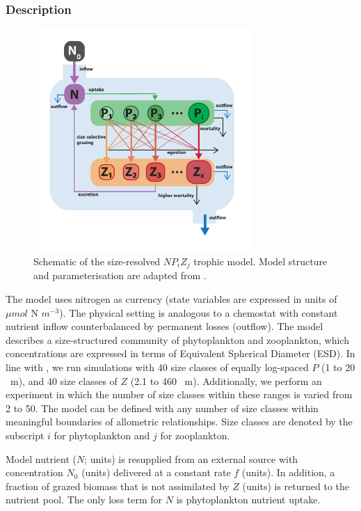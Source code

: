 \documentclass[journal abbreviation, manuscript]{copernicus}
\begin{document}
\subsubsection{Description}
\begin{figure}[t]
\includegraphics[width=8.3cm]{Figures/firstdraft_schematics/03_schematics_ASTroCAT.pdf}
\caption{Schematic of the size-resolved $NP_{i}Z_{j}$ trophic model. Model structure and parameterisation are adapted from \citet{Banas2011b}.}
\label{Figure:ModelSchematics_3}
\end{figure}

The model uses nitrogen as currency (state variables are expressed in units of $\mu mol$ N $m^{-3}$). The physical setting is analogous to a chemostat with constant nutrient inflow counterbalanced by permanent losses (outflow). The model describes a size-structured community of phytoplankton and zooplankton, which concentrations are expressed in terms of Equivalent Spherical Diameter (ESD). In line with \citet{Banas2011b}, we run simulations with 40 size classes of equally log-spaced $P$ (1 to 20 \unit{\mu m}), and 40 size classes of $Z$ (2.1 to 460  \unit{\mu m}). Additionally, we perform an experiment in which the number of size classes within these ranges is varied from 2 to 50. The model can be defined with any number of size classes within meaningful boundaries of allometric relationships. Size classes are denoted by the subscript $i$ for phytoplankton and $j$ for zooplankton.

Model nutrient ($N$; units) is resupplied from an external source with concentration $N_0$ (units) delivered at a constant rate $f$ (units). In addition, a fraction of grazed biomass that is not assimilated by $Z$ (units) is returned to the nutrient pool. The only loss term for $N$ is phytoplankton nutrient uptake.
\end{document}
